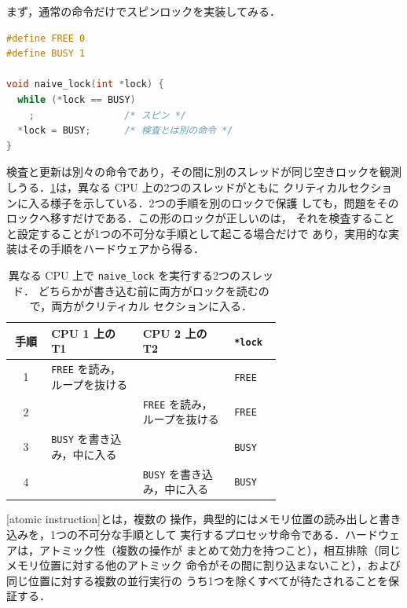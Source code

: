\documentclass[../main.tex]{subfiles}
\begin{document}
まず，通常の命令だけでスピンロックを実装してみる．
\begin{lstlisting}[language=C, numbers=none]
#define FREE 0
#define BUSY 1

void naive_lock(int *lock) {
  while (*lock == BUSY)
    ;                /* スピン */
  *lock = BUSY;      /* 検査とは別の命令 */
}
\end{lstlisting}
検査と更新は別々の命令であり，その間に別のスレッドが同じ空きロックを観測
しうる．\cref{tab:l10-naive-race}は，異なる CPU 上の2つのスレッドがともに
クリティカルセクションに入る様子を示している．2つの手順を別のロックで保護
しても，問題をそのロックへ移すだけである．この形のロックが正しいのは，
それを検査することと設定することが1つの不可分な手順として起こる場合だけで
あり，実用的な実装はその手順をハードウェアから得る．

\begin{table}[htbp]
  \centering
  \caption{異なる CPU 上で \texttt{naive\_lock} を実行する2つのスレッド．
    どちらかが書き込む前に両方がロックを読むので，両方がクリティカル
    セクションに入る．}
  \label{tab:l10-naive-race}
  \small
  \begin{tabular}{@{}c>{\raggedright\arraybackslash}p{0.34\linewidth}>{\raggedright\arraybackslash}p{0.34\linewidth}l@{}}
    \toprule
    手順 & CPU 1 上の T1 & CPU 2 上の T2 & \texttt{*lock} \\
    \midrule
    1 & \texttt{FREE} を読み，ループを抜ける &                                      & \texttt{FREE} \\
    2 &                                      & \texttt{FREE} を読み，ループを抜ける & \texttt{FREE} \\
    3 & \texttt{BUSY} を書き込み，中に入る   &                                      & \texttt{BUSY} \\
    4 &                                      & \texttt{BUSY} を書き込み，中に入る   & \texttt{BUSY} \\
    \bottomrule
  \end{tabular}
\end{table}

\begin{definition}[アトミック命令]
  [atomic instruction]とは，複数の
  操作，典型的にはメモリ位置の読み出しと書き込みを，1つの不可分な手順として
  実行するプロセッサ命令である．ハードウェアは，アトミック性（複数の操作が
  まとめて効力を持つこと），相互排除（同じメモリ位置に対する他のアトミック
  命令がその間に割り込まないこと），および同じ位置に対する複数の並行実行の
  うち1つを除くすべてが待たされることを保証する．
\end{definition}
\end{document}
